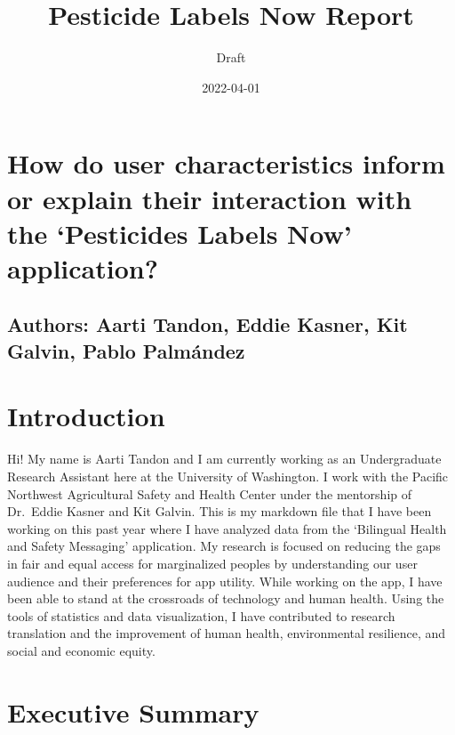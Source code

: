\documentclass[
]{article}
\title{Pesticide Labels Now Report}
\subtitle{Draft}
\author{}
\date{\vspace{-2.5em}2022-04-01}
\begin{document}
\maketitle

{
\setcounter{tocdepth}{4}
\tableofcontents
}
\tableofcontents

\hypertarget{how-do-user-characteristics-inform-or-explain-their-interaction-with-the-pesticides-labels-now-application}{%
\section{How do user characteristics inform or explain their interaction
with the `Pesticides Labels Now'
application?}\label{how-do-user-characteristics-inform-or-explain-their-interaction-with-the-pesticides-labels-now-application}}

\hypertarget{authors-aarti-tandon-eddie-kasner-kit-galvin-pablo-palmuxe1ndez}{%
\subsection{Authors: Aarti Tandon, Eddie Kasner, Kit Galvin, Pablo
Palmández}\label{authors-aarti-tandon-eddie-kasner-kit-galvin-pablo-palmuxe1ndez}}

\hypertarget{introduction}{%
\section{Introduction}\label{introduction}}

Hi! My name is Aarti Tandon and I am currently working as an
Undergraduate Research Assistant here at the University of Washington. I
work with the Pacific Northwest Agricultural Safety and Health Center
under the mentorship of Dr.~Eddie Kasner and Kit Galvin. This is my
markdown file that I have been working on this past year where I have
analyzed data from the `Bilingual Health and Safety Messaging'
application. My research is focused on reducing the gaps in fair and
equal access for marginalized peoples by understanding our user audience
and their preferences for app utility. While working on the app, I have
been able to stand at the crossroads of technology and human health.
Using the tools of statistics and data visualization, I have contributed
to research translation and the improvement of human health,
environmental resilience, and social and economic equity.

\hypertarget{executive-summary}{%
\section{Executive Summary}\label{executive-summary}}
\end{document}
